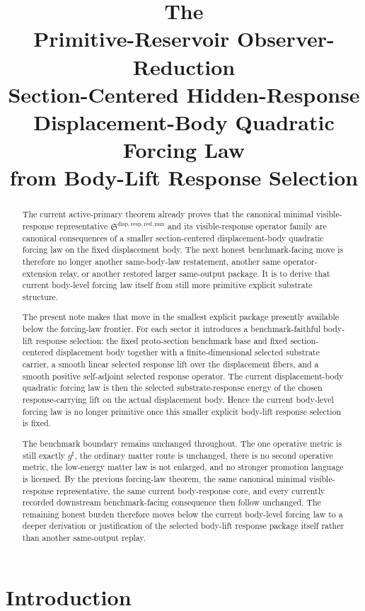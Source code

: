 \documentclass[11pt]{article}
\title{\textbf{The \TheoryName{}}\\[0.4em]
\large Primitive-Reservoir Observer-Reduction\\
\large Section-Centered Hidden-Response\\
\large Displacement-Body Quadratic Forcing Law\\
\large from Body-Lift Response Selection}
\author{}
\date{}
\newcommand{\CompletedMetric}{g^{\sharp}}
\newcommand{\MinimalReducedStructure}{\mathfrak S^{\mathrm{disp,resp,red,min}}}
\begin{document}
\maketitle

\begin{abstract}
The current active-primary theorem already proves that the canonical minimal visible-response representative \(\MinimalReducedStructure\) and its visible-response operator family are canonical consequences of a smaller section-centered displacement-body quadratic forcing law on the fixed displacement body. The next honest benchmark-facing move is therefore no longer another same-body-law restatement, another same operator-extension relay, or another restored larger same-output package. It is to derive that current body-level forcing law itself from still more primitive explicit substrate structure.

The present note makes that move in the smallest explicit package presently available below the forcing-law frontier. For each sector it introduces a benchmark-faithful body-lift response selection: the fixed proto-section benchmark base and fixed section-centered displacement body together with a finite-dimensional selected substrate carrier, a smooth linear selected response lift over the displacement fibers, and a smooth positive self-adjoint selected response operator. The current displacement-body quadratic forcing law is then the selected substrate-response energy of the chosen response-carrying lift on the actual displacement body. Hence the current body-level forcing law is no longer primitive once this smaller explicit body-lift response selection is fixed.

The benchmark boundary remains unchanged throughout. The one operative metric is still exactly \(\CompletedMetric\), the ordinary matter route is unchanged, there is no second operative metric, the low-energy matter law is not enlarged, and no stronger promotion language is licensed. By the previous forcing-law theorem, the same canonical minimal visible-response representative, the same current body-response core, and every currently recorded downstream benchmark-facing consequence then follow unchanged. The remaining honest burden therefore moves below the current body-level forcing law to a deeper derivation or justification of the selected body-lift response package itself rather than another same-output replay.
\end{abstract}

\section{Introduction}
\end{document}
